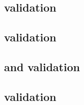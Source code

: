\begin{sbmlenum}

\begin{blockChanged}


\end{blockChanged}


\end{sbmlenum} \subsection*{ validation} \begin{sbmlenum}


\begin{blockChanged}


\end{blockChanged}

\end{sbmlenum} \subsection*{ validation} \begin{sbmlenum}


\end{sbmlenum} \subsection*{ and  validation} \begin{sbmlenum}


\begin{blockChanged}


\end{blockChanged}


\end{sbmlenum} \subsection*{ validation} \begin{sbmlenum}


\end{sbmlenum}
